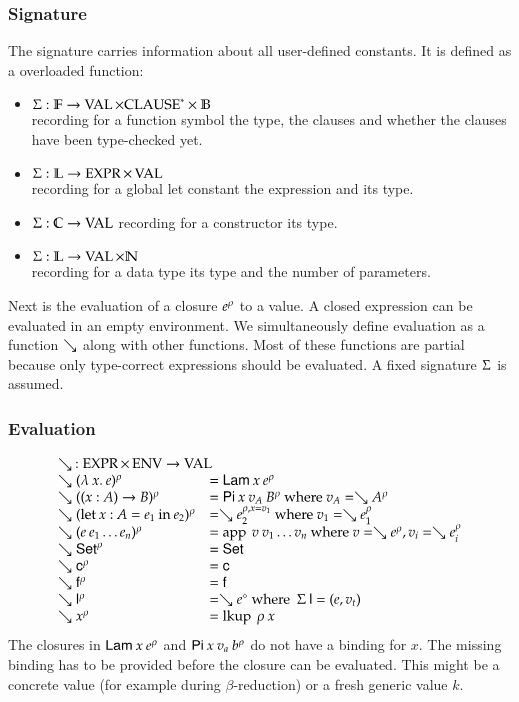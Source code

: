 \subsubsection{Signature}
The signature carries information about all user-defined constants.
It is defined as a overloaded function:
\begin{itemize}
\item
$ \Sigma : \mathbb{F} \rightarrow \operatorname{VAL} \times {\operatorname{CLAUSE}}^{\ast} \times \mathbb{B} $\\
recording for a function symbol the type, the clauses and whether the clauses have been type-checked yet.
\item
$ \Sigma : \mathbb{L} \rightarrow \operatorname{EXPR} \times \operatorname{VAL} $ \\
recording for a global let constant the expression and its type. 
\item
$ \Sigma : \mathbb{C} \rightarrow \operatorname{VAL} $
recording for a constructor its type.
\item
$ \Sigma : \mathbb{L} \rightarrow \operatorname{VAL} \times \mathbb{N} $\\
recording for a data type its type and the number of parameters.
\end{itemize}

Next is the evaluation of a closure $e^{\rho}$ to a value. 
A closed expression can be evaluated in an empty environment.
We simultaneously define evaluation as a function $\searrow$ along with other functions.    
Most of these functions are partial because only type-correct expressions should be evaluated.
A fixed signature $\Sigma$ is assumed.

\subsubsection{Evaluation}

\[
\begin{array}{ll}
\multicolumn{2}{l}{\wh \: : \Expr \times \Env \ra \Val}\\
\wh \clp{\lam{x}{e}}{\rho} & = \vlam \: x \: \cl{e}{\rho} \\
\wh \clp{\EPi{x}{A}{B}}{\rho} &= \vpi \: x \: v_A \: \cl{B}{\rho} \mbox{ where } v_A = \wh \cl{A}{\rho} \\
\wh \clp{\ELet{x}{A}{e_1}{e_2}}{\rho} &= \wh \cl{e_2}{\ins{\rho}{x}{v_1}} \mbox { where } v_1 = \wh \cl{e_1}{\rho} \\
\wh \clp{e \: e_1 \ldots e_n}{\rho} &= \ap \: v \: v_1 \ldots v_n \mbox{ where } v = \wh \cl{e}{\rho} , v_i = \wh \cl{e_i}{\rho}\\
\wh \cl{\Set}{\rho} & = \Set \\ 
\wh \cl{\cc}{\rho} & = \cc  \\
\wh \cl{\ff}{\rho} & = \ff \\
\wh \cl{\dd}{\rho} & = \wh \cl{e}{\diamond} \mbox{ where } \: \Sig \: \dd = (e,v_t)\\
\wh \cl{x}{\rho} & = \lkup \: \rho \: x \\
\end{array}
\]
The closures in $\mathsf{Lam} \: x \: e^{\rho}$
and $\mathsf{Pi} \: x \: v_a \: b^{\rho}$ do not have a binding for $x$.
The missing binding has to be provided before the closure can be evaluated.
This might be a concrete value (for example during $\beta$-reduction) or a
fresh generic value $k$.

